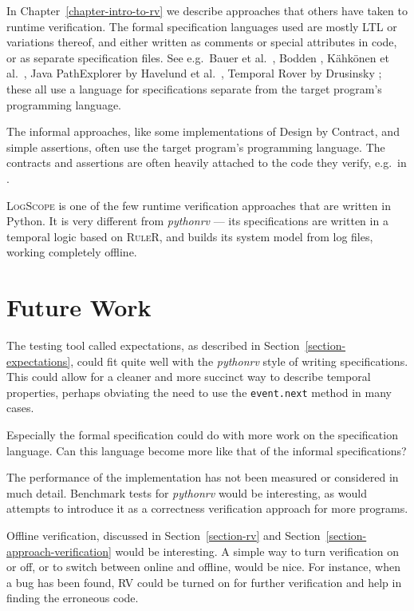 In Chapter~\ref{chapter-intro-to-rv} we describe approaches that others have
taken to runtime verification. The formal specification languages used are
mostly LTL or variations thereof, and either written as comments or special
attributes in code, or as separate specification files. See e.g.\ Bauer et
al.\ \cite{bauer06monitoring}, Bodden \cite{bodden05efficientrv}, Kähkönen et
al.\ \cite{kahkonen09lime}, Java PathExplorer by Havelund et al.\
\cite{havelund04jpax}, Temporal Rover by Drusinsky
\cite{drusinsky00temporalrover}; these all use a language for specifications
separate from the target program's programming language.

The informal approaches, like some implementations of Design by Contract, and
simple assertions, often use the target program's programming language. The
contracts and assertions are often heavily attached to the code they verify,
e.g.\ in \cite{bartetzko01jass,meyer92applyingdbc}.

\textsc{LogScope} \cite{barringer09tutorial} is one of the few runtime
verification approaches that are written in Python. It is very different from
\textit{pythonrv} --- its specifications are written in a temporal logic based
on \textsc{RuleR}, and builds its system model from log files, working
completely offline.

\section{Future Work}

The testing tool called expectations, as described in
Section~\ref{section-expectations}, could fit quite well with the
\textit{pythonrv} style of writing specifications. This could allow for a
cleaner and more succinct way to describe temporal properties, perhaps
obviating the need to use the \texttt{event.next} method in many cases.

Especially the formal specification could do with more work on the
specification language. Can this language become more like that of the informal
specifications?

The performance of the implementation has not been measured or considered in
much detail. Benchmark tests for \textit{pythonrv} would be interesting, as
would attempts to introduce it as a correctness verification approach for more
programs.

Offline verification, discussed in Section~\ref{section-rv} and
Section~\ref{section-approach-verification} would be interesting. A simple way
to turn verification on or off, or to switch between online and offline, would
be nice. For instance, when a bug has been found, RV could be turned on for
further verification and help in finding the erroneous code.

